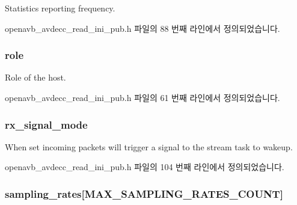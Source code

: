 Statistics reporting frequency. 



openavb\+\_\+avdecc\+\_\+read\+\_\+ini\+\_\+pub.\+h 파일의 88 번째 라인에서 정의되었습니다.

\subsubsection[{\texorpdfstring{role}{role}}]{ role}\hypertarget{structopenavb__tl__data__cfg_a172ec388c6d270261a61a789b78dff45}{}\label{structopenavb__tl__data__cfg_a172ec388c6d270261a61a789b78dff45}


Role of the host. 



openavb\+\_\+avdecc\+\_\+read\+\_\+ini\+\_\+pub.\+h 파일의 61 번째 라인에서 정의되었습니다.

\subsubsection[{\texorpdfstring{rx\+\_\+signal\+\_\+mode}{rx_signal_mode}}]{ rx\+\_\+signal\+\_\+mode}\hypertarget{structopenavb__tl__data__cfg_a580a82350a4c45004177344444bd25c5}{}\label{structopenavb__tl__data__cfg_a580a82350a4c45004177344444bd25c5}


When set incoming packets will trigger a signal to the stream task to wakeup. 



openavb\+\_\+avdecc\+\_\+read\+\_\+ini\+\_\+pub.\+h 파일의 104 번째 라인에서 정의되었습니다.

\subsubsection[{\texorpdfstring{sampling\+\_\+rates}{sampling_rates}}]{ sampling\+\_\+rates\mbox{[}{\bf M\+A\+X\+\_\+\+S\+A\+M\+P\+L\+I\+N\+G\+\_\+\+R\+A\+T\+E\+S\+\_\+\+C\+O\+U\+NT}\mbox{]}}\hypertarget{structopenavb__tl__data__cfg_a4d629576141d6cb141a196f015fcd6ad}{}\label{structopenavb__tl__data__cfg_a4d629576141d6cb141a196f015fcd6ad}


